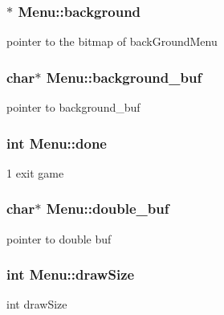 \subsubsection[{\texorpdfstring{background}{background}}]{$\ast$ Menu\+::background}\hypertarget{structMenu_a557df5703b8c0a3a4096652ab49dcbf4}{}\label{structMenu_a557df5703b8c0a3a4096652ab49dcbf4}
pointer to the bitmap of back\+Ground\+Menu 
\subsubsection[{\texorpdfstring{background\+\_\+buf}{background_buf}}]{\setlength{\rightskip}{0pt plus 5cm}char$\ast$ Menu\+::background\+\_\+buf}\hypertarget{structMenu_a69746dd4ac7c76d1eae9a8e68df1d0c5}{}\label{structMenu_a69746dd4ac7c76d1eae9a8e68df1d0c5}
pointer to background\+\_\+buf 
\subsubsection[{\texorpdfstring{done}{done}}]{\setlength{\rightskip}{0pt plus 5cm}int Menu\+::done}\hypertarget{structMenu_a457588a82fea9415b58c5b9ee2595e88}{}\label{structMenu_a457588a82fea9415b58c5b9ee2595e88}
1 exit game 
\subsubsection[{\texorpdfstring{double\+\_\+buf}{double_buf}}]{\setlength{\rightskip}{0pt plus 5cm}char$\ast$ Menu\+::double\+\_\+buf}\hypertarget{structMenu_a848a585b394d3469c3201ef9a17b5df7}{}\label{structMenu_a848a585b394d3469c3201ef9a17b5df7}
pointer to double buf 
\subsubsection[{\texorpdfstring{draw\+Size}{drawSize}}]{\setlength{\rightskip}{0pt plus 5cm}int Menu\+::draw\+Size}\hypertarget{structMenu_a45c1b1aff3e0462d504bc4cd4bb92f51}{}\label{structMenu_a45c1b1aff3e0462d504bc4cd4bb92f51}
int draw\+Size 
